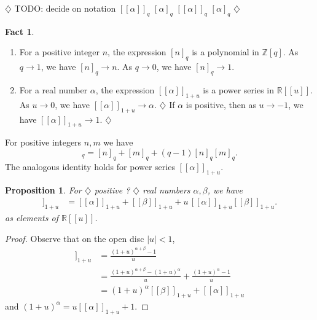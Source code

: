 \documentclass{amsart}
\newtheorem{prop}[thm]{Proposition}
\theoremstyle{definition}
\newtheorem{fact}[thm]{Fact}
\newcommand{\RR}{\mathbb{R}}
\newcommand{\ZZ}{\mathbb{Z}}
\newcommand{\fanalog}[2]{[\![#2]\!]_{#1}}
\newcommand{\analog}[2]{[#2]_{#1}}
\newcommand{\harry}[1]{{\color{red} \sf $\diamondsuit$  {#1} $\diamondsuit$ }}
\newcommand{\note}[1]{\harry{#1}}
\begin{document}
\note{
TODO: decide on notation
$\fanalog{q}{\alpha}$
$\analog{q}{\alpha}$
$[\![\alpha]\!]_q$
$\left[\alpha\right]_q$
}

\begin{fact}
\hfill
\begin{enumerate}
\item 
For a positive integer $n$, the expression $\analog{q}{n}$ is a polynomial in $\ZZ[q]$. 
As $q \to 1$, we have $\analog{q}{n} \to n$.
As $q \to 0$, we have $\analog{q}{n} \to 1$.

\item 
For a real number $\alpha$, the expression $\fanalog{1 + u}{\alpha}$ is a power series in $\RR[[u]]$.
As $u \to 0$, we have $\fanalog{1 + u}{\alpha} \to \alpha$.
\note{If $\alpha$ is positive, then as $u \to -1$, we have $\fanalog{1 + u}{\alpha} \to 1$.}
\end{enumerate}
\end{fact}

For positive integers $n,m$ we have
\begin{equation*}
\analog{q}{n + m}
 = \analog{q}{n} + \analog{q}{m} + (q-1) \analog{q}{n} \analog{q}{m} .
\end{equation*}
The analogous identity holds for power series $\fanalog{1 + u}{\alpha}$.
\begin{prop}
For \note{positive ?} real numbers $\alpha,\beta$, we have
\begin{align*}
\fanalog{1 + u}{\alpha + \beta} 
 &= \fanalog{1 + u}{\alpha} + \fanalog{1 + u}{\beta} + u \, \fanalog{1 + u}{\alpha} \fanalog{1 + u}{\beta} .
\end{align*}
as elements of $\RR[[u]]$.
\end{prop}
\begin{proof}
Observe that on the open disc $|u| < 1$,
\begin{align*}
\fanalog{1 + u}{\alpha + \beta} &= \frac{(1+u)^{\alpha+\beta}-1}{u} \\
&= \frac{(1+u)^{\alpha+\beta}-(1+u)^\alpha}{u} + \frac{(1+u)^{\alpha}-1}{u} \\
&= (1+u)^\alpha \fanalog{1 + u}{\beta} + \fanalog{1 + u}{\alpha} 
\end{align*}
and
$
(1 + u)^\alpha 
= u \fanalog{1 + u}{\alpha} + 1 .
$
\end{proof}
\end{document}
